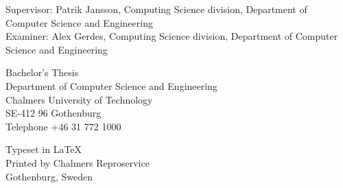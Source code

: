 Supervisor: Patrik Jansson, Computing Science division, Department of Computer Science and Engineering\\
Examiner: Alex Gerdes, Computing Science division, Department of Computer Science and Engineering \setlength{\parskip}{1cm}

Bachelor's Thesis \the\year\\	
Department of Computer Science and Engineering\\
Chalmers University of Technology\\
SE-412 96 Gothenburg\\
Telephone +46 31 772 1000 \setlength{\parskip}{0.5cm}

\vfill

Typeset in \LaTeX \tagtemp\\
Printed by Chalmers Reproservice\\
Gothenburg, Sweden \the\year
